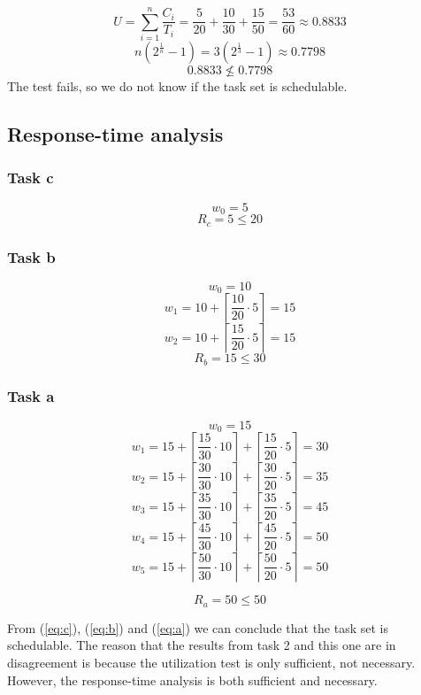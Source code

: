 \documentclass[11pt]{article}
\begin{document}
\[ U = \displaystyle\sum_{i = 1}^{n} \frac{C_{i}}{T_{i}} = \frac{5}{20} + \frac{10}{30} +
\frac{15}{50} = \frac{53}{60} \approx 0.8833\]
\[ n(2^{\frac{1}{n}} - 1) = 3(2^{\frac{1}{3}}-1) \approx 0.7798 \]
\[ 0.8833 \nleq 0.7798 \]
The test fails, so we do not know if the task set is schedulable.

\subsection{Response-time analysis}
\label{sec-4-3}
\subsubsection{Task c}
\label{sec-4-3-1}
\[ w_0 = 5 \]
\begin{equation}
\label{eq:c}
R_c = 5 \leq 20
\end{equation}

\subsubsection{Task b}
\label{sec-4-3-2}
\[w_0 = 10 \]
\[w_1 = 10 + \left \lceil \frac{10}{20} \cdot 5 \right \rceil = 15 \]
\[w_2 = 10 + \left \lceil \frac{15}{20} \cdot 5 \right \rceil = 15 \]
\begin{equation}
\label{eq:b}
R_b = 15 \leq 30
\end{equation}

\subsubsection{Task a}
\label{sec-4-3-3}
\[ w_0 = 15 \]
\[ w_1 = 15 + \left \lceil \frac{15}{30} \cdot 10 \right \rceil + \left \lceil \frac{15}{20} \cdot 5 \right \rceil = 30 \]
\[ w_2 = 15 + \left \lceil \frac{30}{30} \cdot 10 \right \rceil + \left \lceil \frac{30}{20} \cdot 5 \right \rceil = 35 \]
\[ w_3 = 15 + \left \lceil \frac{35}{30} \cdot 10 \right \rceil + \left \lceil \frac{35}{20} \cdot 5 \right \rceil = 45 \]
\[ w_4 = 15 + \left \lceil \frac{45}{30} \cdot 10 \right \rceil + \left \lceil \frac{45}{20} \cdot 5 \right \rceil = 50 \]
\[ w_5 = 15 + \left \lceil \frac{50}{30} \cdot 10 \right \rceil + \left \lceil \frac{50}{20} \cdot 5 \right \rceil = 50 \]

\begin{equation}
\label{eq:a}
R_a = 50 \leq 50
\end{equation}

From (\ref{eq:c}), (\ref{eq:b}) and (\ref{eq:a}) we can conclude that the task set is schedulable.
The reason that the results from task 2 and this one are in disagreement is because the utilization test is only sufficient, not necessary. However, the response-time analysis is both sufficient and necessary.
\end{document}

